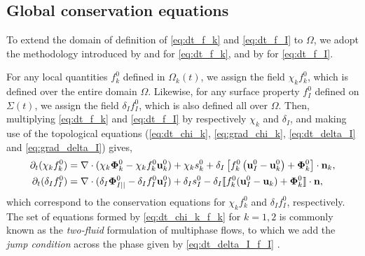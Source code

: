 \subsection{Global conservation equations}

To extend the domain of definition of \ref{eq:dt_f_k} and \ref{eq:dt_f_I} to $\Omega$, we adopt the methodology introduced by \citet{drew1983mathematical} and \citet{kataoka1986local} for \ref{eq:dt_f_k}, and by \citet[Appendix 2]{marle1982macroscopic} for \ref{eq:dt_f_I}.

For any local quantities $f_k^0$ defined in $\Omega_k(t)$, we assign the field $\chi_k f_k^0$, which is defined over the entire domain $\Omega$. 
Likewise, for any surface property $f_I^0$ defined on $\Sigma(t)$, we assign the field $\delta_I f_I^0$, which is also defined all over $\Omega$. 
Then, multiplying \ref{eq:dt_f_k} and \ref{eq:dt_f_I} by respectively $\chi_k$ and $\delta_I$, and making use of the topological equations (\ref{eq:dt_chi_k}, \ref{eq:grad_chi_k}, \ref{eq:dt_delta_I} and \ref{eq:grad_delta_I}) gives, 
\begin{align}
    \partial_t (\chi_k f_k^0)
    &= \mathbf{\nabla}\cdot (\chi_k \mathbf{\Phi}_k^0 - \chi_k f_k^0 \textbf{u}_k^0)
    + \chi_k s_k^0
    + \delta_I\left[
        f_k^0
        \left(
            \textbf{u}_I^0
            - \textbf{u}_k^0
        \right)
        + \mathbf{\Phi}_k^0
    \right]
    \cdot \textbf{n}_k ,
    \label{eq:dt_chi_k_f_k}\\
    \partial_t (\delta_If_I^0)  
    &= 
    \mathbf{\nabla}\cdot (\delta_I \mathbf{\Phi}_{I||}^0 - \delta_I f_I^0 \textbf{u}_I^0)
    +\delta_Is_I^0
    - \delta_I \llbracket 
    f_k^0 (\textbf{u}_I^0 - \textbf{u}_k)
    + \mathbf{\Phi}_k^0
     \rrbracket \cdot \textbf{n},
    \label{eq:dt_delta_I_f_I}
\end{align}
which correspond to the conservation equations for $\chi_kf_k^0$ and $\delta_If_I^0$, respectively.
The set of equations formed by \ref{eq:dt_chi_k_f_k} for $k =1,2$ is commonly known as the \textit{two-fluid} formulation of multiphase flows, to which we add the \textit{jump condition} across the phase given by \ref{eq:dt_delta_I_f_I} \citep{morel2015mathematical,tryggvason2011direct,drew1983mathematical,kataoka1986local}. 

